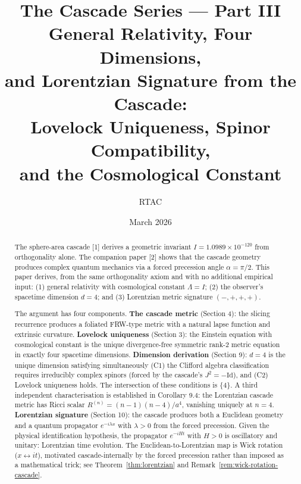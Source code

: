 \documentclass[12pt,a4paper]{article}
\title{\textbf{The Cascade Series --- Part III}\\[6pt]
General Relativity, Four Dimensions,\\
and Lorentzian Signature from the Cascade:\\
Lovelock Uniqueness, Spinor Compatibility,\\
and the Cosmological Constant}
\author{RTAC}
\date{March 2026}
\begin{document}
\setlength{\emergencystretch}{3em}
\maketitle
{}
\label{paperdoc}

\begin{abstract}
The sphere-area cascade [1] derives a geometric invariant $I = 1.0989 \times 10^{-120}$
from orthogonality alone. The companion paper [2] shows that the cascade geometry
produces complex quantum mechanics via a forced precession angle $\alpha = \pi/2$. This
paper derives, from the same orthogonality axiom and with no additional empirical
input: (1) general relativity with cosmological constant $\Lambda = I$; (2) the observer's
spacetime dimension $d = 4$; and (3) Lorentzian metric signature $(-,+,+,+)$.

The argument has four components. \textbf{The cascade metric} (Section 4): the slicing
recurrence produces a foliated FRW-type metric with a natural lapse function and
extrinsic curvature. \textbf{Lovelock uniqueness} (Section 3): the Einstein equation with
cosmological constant is the unique divergence-free symmetric rank-2 metric equation
in exactly four spacetime dimensions. \textbf{Dimension derivation} (Section 9): $d = 4$ is the
unique dimension satisfying simultaneously (C1) the Clifford algebra classification
requires irreducibly complex spinors (forced by the cascade's $J^2 = -\text{Id}$), and (C2)
Lovelock uniqueness holds. The intersection of these conditions is $\{4\}$. A third
independent characterisation is established in Corollary 9.4: the Lorentzian cascade
metric has Ricci scalar $R^{(n)} = (n-1)(n-4)/a^4$, vanishing uniquely at $n = 4$.
\textbf{Lorentzian signature} (Section 10): the cascade produces both a Euclidean geometry
and a quantum propagator $e^{-i\lambda x}$ with $\lambda > 0$ from the forced precession. Given the
physical identification hypothesis, the propagator $e^{-iHt}$ with $H > 0$ is oscillatory
and unitary: Lorentzian time evolution. The Euclidean-to-Lorentzian
map is Wick rotation ($x\leftrightarrow it$), motivated
cascade-internally by the forced precession rather than imposed as a
mathematical trick; see Theorem~\ref{thm:lorentzian} and
Remark~\ref{rem:wick-rotation-cascade}.


\end{abstract}
\end{document}

